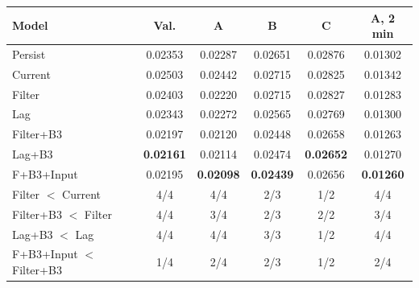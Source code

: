 \begin{tabular}{lccccc}
\toprule
Model & Val. & A & B & C & A, 2 min \\
\midrule
Persist & 0.02353 & 0.02287 & 0.02651 & 0.02876 & 0.01302 \\
Current & 0.02503 & 0.02442 & 0.02715 & 0.02825 & 0.01342 \\
Filter & 0.02403 & 0.02220 & 0.02715 & 0.02827 & 0.01283 \\
Lag & 0.02343 & 0.02272 & 0.02565 & 0.02769 & 0.01300 \\
Filter+B3 & 0.02197 & 0.02120 & 0.02448 & 0.02658 & 0.01263 \\
Lag+B3 & \textbf{0.02161} & 0.02114 & 0.02474 & \textbf{0.02652} & 0.01270 \\
F+B3+Input & 0.02195 & \textbf{0.02098} & \textbf{0.02439} & 0.02656 & \textbf{0.01260} \\
\midrule
Filter $<$ Current & 4/4 & 4/4 & 2/3 & 1/2 & 4/4 \\
Filter+B3 $<$ Filter & 4/4 & 3/4 & 2/3 & 2/2 & 3/4 \\
Lag+B3 $<$ Lag & 4/4 & 4/4 & 3/3 & 1/2 & 4/4 \\
F+B3+Input $<$ Filter+B3 & 1/4 & 2/4 & 2/3 & 1/2 & 2/4 \\
\bottomrule
\end{tabular}
